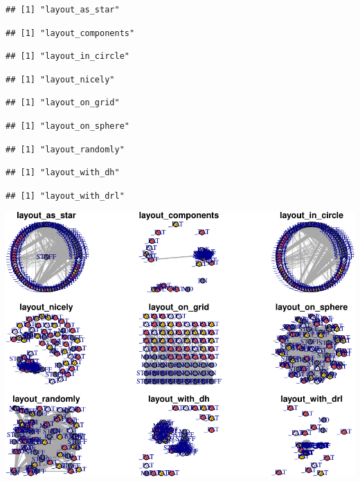 \documentclass[]{elsarticle} %
\makeatletter
\def\maxwidth{\ifdim\Gin@nat@width>\linewidth\linewidth
\else\Gin@nat@width\fi}
\let\Oldincludegraphics\includegraphics
\renewcommand{\includegraphics}[1]{\Oldincludegraphics[width=\maxwidth]{#1}}
\makeatother
\begin{document}
\begin{verbatim}
## [1] "layout_as_star"
\end{verbatim}

\begin{verbatim}
## [1] "layout_components"
\end{verbatim}

\begin{verbatim}
## [1] "layout_in_circle"
\end{verbatim}

\begin{verbatim}
## [1] "layout_nicely"
\end{verbatim}

\begin{verbatim}
## [1] "layout_on_grid"
\end{verbatim}

\begin{verbatim}
## [1] "layout_on_sphere"
\end{verbatim}

\begin{verbatim}
## [1] "layout_randomly"
\end{verbatim}

\begin{verbatim}
## [1] "layout_with_dh"
\end{verbatim}

\begin{verbatim}
## [1] "layout_with_drl"
\end{verbatim}

\includegraphics{Flynn_Project_files/figure-latex/shift23 layouts-1.pdf}
\end{document}
